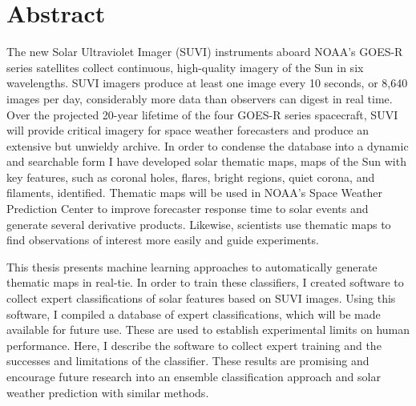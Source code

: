 \documentclass[twoside]{report}
\begin{document}
\tableofcontents
\listoffigures
\listoftables
\onehalfspacing

\chapter*{Abstract}
The new Solar Ultraviolet Imager (SUVI) instruments aboard NOAA’s GOES-R series satellites collect continuous, high-quality imagery of the Sun in six wavelengths. SUVI imagers produce at least one image every 10 seconds, or 8,640 images per day, considerably more data than observers can digest in real time. Over the projected 20-year lifetime of the four GOES-R series spacecraft, SUVI will provide critical imagery for space weather forecasters and produce an extensive but unwieldy archive. In order to condense the database into a dynamic and searchable form I have developed solar thematic maps, maps of the Sun with key features, such as coronal holes, flares, bright regions, quiet corona, and filaments, identified. Thematic maps will be used in NOAA’s Space Weather Prediction Center to improve forecaster response time to solar events and generate several derivative products. Likewise, scientists use thematic maps to find observations of interest more easily and guide experiments. 

This thesis presents machine learning approaches to automatically generate thematic maps in real-tie. In order to train these classifiers, I created software to collect expert classifications of solar features based on SUVI images. Using this software, I compiled a database of expert classifications, which will be made available for future use. These are used to establish experimental limits on human performance. Here, I describe the software to collect expert training and the successes and limitations of the classifier. These results are promising and encourage future research into an ensemble classification approach and solar weather prediction with similar methods.
\end{document}
